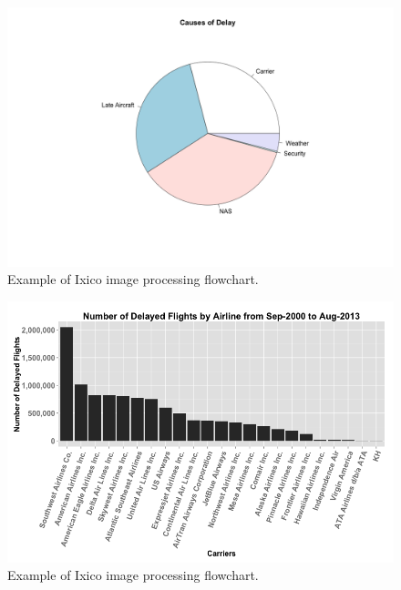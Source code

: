 \documentclass[11pt,twoside,titlepage]{article}
\begin{document}
\begin{figure}[h!]
        \centering
                \includegraphics[width=16cm]{Pie.png}
        \caption{Example of Ixico image processing flowchart.}\label{fig:Pie}
\end{figure}



\begin{figure}[h!]
        \centering
                \includegraphics[width=16cm]{Delayed_by_Airline1.png}
        \caption{Example of Ixico image processing flowchart.}\label{fig:flowchart}
\end{figure}
\end{document}
